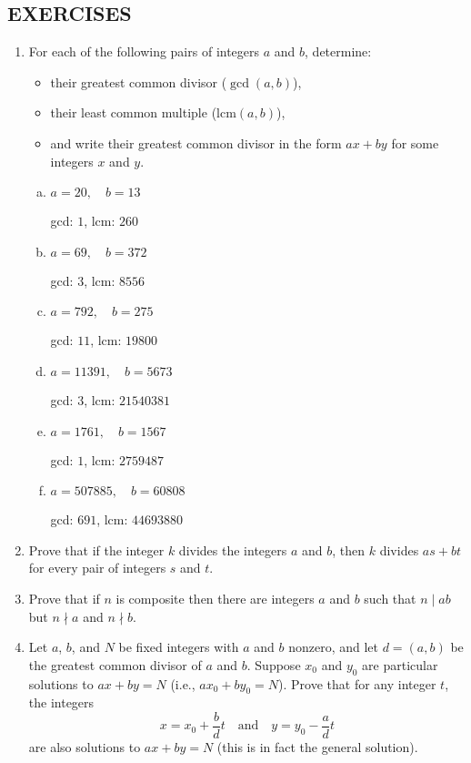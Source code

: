 \subsection*{\centering EXERCISES}
\begin{enumerate}
    \item For each of the following pairs of integers $a$ and $b$, determine:
    \begin{itemize}
        \item their greatest common divisor ($\gcd(a,b)$),
        \item their least common multiple ($\text{lcm}(a,b)$),
        \item and write their greatest common divisor in the form $ax + by$ for some integers $x$ and $y$.
    \end{itemize}

    \begin{enumerate}[(a)]
        \item $a = 20,\quad b = 13$
        
        gcd: $1$, lcm: $260$
        \item $a = 69,\quad b = 372$
        
        gcd: $3$, lcm: $8556$
        \item $a = 792,\quad b = 275$
        
        gcd: $11$, lcm: $19800$
        \item $a = 11391,\quad b = 5673$
        
        gcd: $3$, lcm: $21540381$
        \item $a = 1761,\quad b = 1567$
        
        gcd: $1$, lcm: $2759487$
        \item $a = 507885,\quad b = 60808$
        
        gcd: $691$, lcm: $44693880$
    \end{enumerate}

    \item Prove that if the integer $k$ divides the integers $a$ and $b$, then $k$ divides $as + bt$ for every pair of integers $s$ and $t$.
    \item Prove that if $n$ is composite then there are integers $a$ and $b$ such that $n \mid ab$ but $n \nmid a$ and $n \nmid b$.

    \item Let $a$, $b$, and $N$ be fixed integers with $a$ and $b$ nonzero, and let $d = (a, b)$ be the greatest common divisor of $a$ and $b$. Suppose $x_0$ and $y_0$ are particular solutions to $ax + by = N$ (i.e., $ax_0 + by_0 = N$). Prove that for any integer $t$, the integers
    \[
    x = x_0 + \frac{b}{d}t \quad \text{and} \quad y = y_0 - \frac{a}{d}t
    \]
    are also solutions to $ax + by = N$ (this is in fact the general solution).


\end{enumerate}
